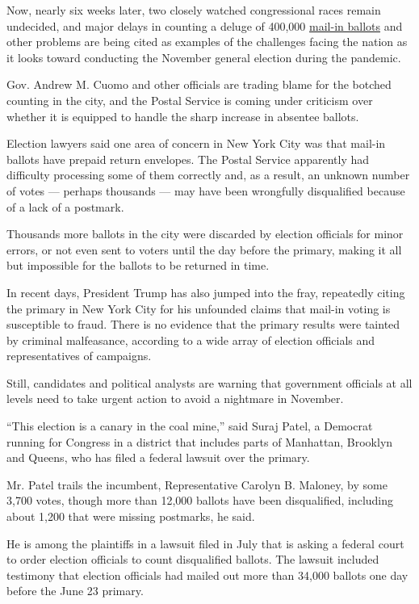 Now, nearly six weeks later, two closely watched congressional races
remain undecided, and major delays in counting a deluge of 400,000
\href{https://www.nytimes3xbfgragh.onion/2020/08/03/us/politics/trump-mail-in-voting.html}{mail-in
ballots} and other problems are being cited as examples of the
challenges facing the nation as it looks toward conducting the November
general election during the pandemic.

Gov. Andrew M. Cuomo and other officials are trading blame for the
botched counting in the city, and the Postal Service is coming under
criticism over whether it is equipped to handle the sharp increase in
absentee ballots.

Election lawyers said one area of concern in New York City was that
mail-in ballots have prepaid return envelopes. The Postal Service
apparently had difficulty processing some of them correctly and, as a
result, an unknown number of votes --- perhaps thousands --- may have
been wrongfully disqualified because of a lack of a postmark.

Thousands more ballots in the city were discarded by election officials
for minor errors, or not even sent to voters until the day before the
primary, making it all but impossible for the ballots to be returned in
time.

In recent days, President Trump has also jumped into the fray,
repeatedly citing the primary in New York City for his unfounded claims
that mail-in voting is susceptible to fraud. There is no evidence that
the primary results were tainted by criminal malfeasance, according to a
wide array of election officials and representatives of campaigns.

Still, candidates and political analysts are warning that government
officials at all levels need to take urgent action to avoid a nightmare
in November.

``This election is a canary in the coal mine,'' said Suraj Patel, a
Democrat running for Congress in a district that includes parts of
Manhattan, Brooklyn and Queens, who has filed a federal lawsuit over the
primary.

Mr. Patel trails the incumbent, Representative Carolyn B. Maloney, by
some 3,700 votes, though more than 12,000 ballots have been
disqualified, including about 1,200 that were missing postmarks, he
said.

He is among the plaintiffs in a lawsuit filed in July that is asking a
federal court to order election officials to count disqualified ballots.
The lawsuit included testimony that election officials had mailed out
more than 34,000 ballots one day before the June 23 primary.


